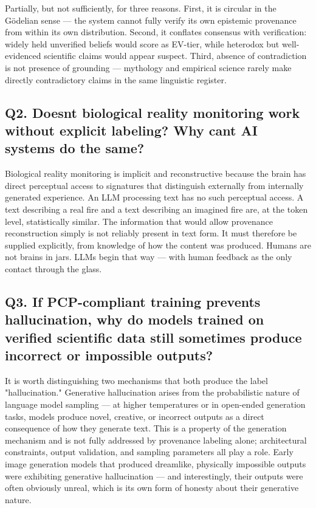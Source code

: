 \documentclass[
]{article}
\begin{document}
Partially, but not sufficiently, for three reasons. First, it is
circular in the Gödelian sense --- the system cannot fully verify its
own epistemic provenance from within its own distribution. Second, it
conflates consensus with verification: widely held unverified beliefs
would score as EV-tier, while heterodox but well-evidenced scientific
claims would appear suspect. Third, absence of contradiction is not
presence of grounding --- mythology and empirical science rarely make
directly contradictory claims in the same linguistic register.

\subsection{Q2. Doesn\textquotesingle t biological reality monitoring
work without explicit labeling? Why can\textquotesingle t AI systems do
the
same?}\label{q2.-doesnt-biological-reality-monitoring-work-without-explicit-labeling-why-cant-ai-systems-do-the-same}

Biological reality monitoring is implicit and reconstructive because the
brain has direct perceptual access to signatures that distinguish
externally from internally generated experience. An LLM processing text
has no such perceptual access. A text describing a real fire and a text
describing an imagined fire are, at the token level, statistically
similar. The information that would allow provenance reconstruction
simply is not reliably present in text form. It must therefore be
supplied explicitly, from knowledge of how the content was produced.
Humans are not brains in jars. LLMs begin that way --- with human
feedback as the only contact through the glass.

\subsection{Q3. If PCP-compliant training prevents hallucination, why do
models trained on verified scientific data still sometimes produce
incorrect or impossible
outputs?}\label{q3.-if-pcp-compliant-training-prevents-hallucination-why-do-models-trained-on-verified-scientific-data-still-sometimes-produce-incorrect-or-impossible-outputs}

It is worth distinguishing two mechanisms that both produce the label
"hallucination." Generative hallucination arises from the probabilistic
nature of language model sampling --- at higher temperatures or in
open-ended generation tasks, models produce novel, creative, or
incorrect outputs as a direct consequence of how they generate text.
This is a property of the generation mechanism and is not fully
addressed by provenance labeling alone; architectural constraints,
output validation, and sampling parameters all play a role. Early image
generation models that produced dreamlike, physically impossible outputs
were exhibiting generative hallucination --- and interestingly, their
outputs were often obviously unreal, which is its own form of honesty
about their generative nature.
\end{document}
